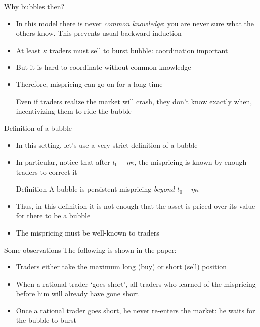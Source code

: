 \documentclass[english,10pt
,aspectratio=169
]{beamer}
\begin{document}
\begin{frame}{Why bubbles then?}
	\begin{itemize}
		\item In this model there is never \emph{common knowledge}: you are never sure what the others know. This prevents usual backward induction
		\item At least $\kappa$ traders must sell to burst bubble: coordination important
		\item But it is hard to coordinate without common knowledge
		\item Therefore, mispricing can go on for a long time
		\begin{block}{}
			Even if traders realize the market will crash, they don't know exactly when, incentivizing them to ride the bubble
		\end{block}
	\end{itemize}
\end{frame}


\begin{frame}{Definition of a bubble}
	\begin{itemize}
		\item In this setting, let's use a very strict definition of a bubble
		\item In particular, notice that after $t_0+\eta\kappa$, the mispricing is known by enough traders to correct it
		\begin{block}{Definition}
			A bubble is persistent mispricing \emph{beyond $t_0+\eta \kappa$}
		\end{block}
		\item Thus, in this definition it is not enough that the asset is priced over its value for there to be a bubble
		\item The mispricing must be well-known to traders
	\end{itemize}
\end{frame}


\begin{frame}{Some observations}
	The following is shown in the paper:
	\begin{itemize}
		\item Traders either take the maximum long (buy) or short (sell) position
		\item When a rational trader `goes short', all traders who learned of the mispricing before him will already have gone short
		\item Once a rational trader goes short, he never re-enters the market: he waits for the bubble to burst
	\end{itemize}
\end{frame}
\end{document}
